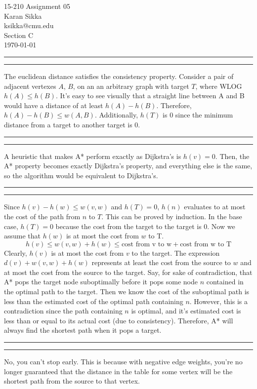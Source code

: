 \documentclass[11pt,letterpaper]{article}
\makeatletter
\newcommand{\question}[2] {\vspace{.25in} \hrule\vspace{0.5em}
\noindent{\bf #1: #2} \vspace{0.5em}
\hrule \vspace{.10in}}
\newcommand{\myname}{Karan Sikka}
\newcommand{\myandrew}{ksikka@cmu.edu}
\newcommand{\myhwnum}{05}
\makeatother
\begin{document}
\medskip

\thispagestyle{plain}
\begin{center}                  %
{\Large 15-210 Assignment \myhwnum} \\
\myname \\
\myandrew \\
Section C\\
\today\\
\end{center}


\question{1}{Task 2.3}
The euclidean distance satisfies the consistency property.
Consider a pair of adjacent vertexes $A$, $B$, on an an
arbitrary graph with target $T$, where WLOG $h(A) \leq h(B)$.
It's easy to see visually that a straight line between A and B would have
a distance of at least $h(A) - h(B)$. Therefore,
$h(A) - h(B) \leq w(A,B)$. Additionally, $h(T)$ is 0
since the minimum distance from a target to another target is 0.

\question{2}{Task 2.4}
A heuristic that makes A* perform exactly as Dijkstra's
is $h(v) = 0$. Then, the A* property becomes exactly Dijkstra's
property, and everything else is the same, so the algorithm
would be equivalent to Dijkstra's.

\question{3}{Task 2.5}
Since $h(v) - h(w) \leq w(v,w)$ and $h(T) = 0$, $h(n)$ evaluates
to at most the cost of the path from $n$ to $T$. This can be
proved by induction. In the base case, $h(T) = 0$ because
the cost from the target to the target is 0. Now we assume
that $h(w)$ is at most the cost from $w$ to T.
$$h(v) \leq w(v,w) + h(w) \leq \text{cost from v to w} + \text{cost from w to T}$$
Clearly, $h(v)$ is at most the cost from $v$ to the target.
The expression $d(v) + w(v,w) + h(w)$ represents at least the cost from the
source to $w$ and at most the cost from the source to the target.
Say, for sake of contradiction, that A* pops the target node suboptimally before
it pops some node $n$ contained in the optimal path to the target.
Then we know the cost of the suboptimal path is less than
the estimated cost of the optimal path containing $n$. However,
this is a contradiction since the path containing $n$ is optimal,
and it's estimated cost is less than or equal to its actual cost (due to consistency).
Therefore, A* will always find the shortest path when it pops a target.


\question{4}{Task 2.7}
No, you can't stop early. This is because with negative edge weights,
you're no longer guaranteed that the distance in the table for some
vertex will be the shortest path from the source to that vertex.
\end{document}
